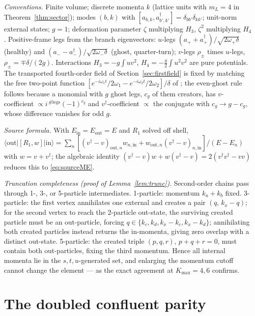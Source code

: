 \documentclass[11pt]{article}
\theoremstyle{definition}
\theoremstyle{remark}
\newcommand{\w}{\omega}
\newcommand{\dg}{\dagger}
\begin{document}
\emph{Conventions.}  Finite volume; discrete momenta $k$ (lattice units
with $m_L=4$ in Theorem~\ref{thm:sector}); modes $(b,k)$ with
$[a_{b,k},a^{\dg}_{b',k'}]=\delta_{bb'}\delta_{kk'}$; unit-norm
external states; $g=1$; deformation parameter $\zeta$ multiplying
$H_3$, $\zeta^2$ multiplying $H_4$.  Positive-frame legs from the
branch eigenvectors:
$u$-legs $(a_++a_+^{\dg})/\sqrt{2\w_+\delta}$ (healthy) and
$(a_--a_-^{\dg})/\sqrt{2\w_-\delta}$ (ghost, quarter-turn);
$v$-legs $\rho_\pm$ times $u$-legs, $\rho_\pm=\mp\delta/(2g)$.
Interactions $H_3=-g\!\int\!uv^2$, $H_4=-\tfrac g2\!\int\!u^2v^2$ are
pure potentials.  The transported fourth-order field of
Section~\ref{sec:firstfield} is fixed by matching the free two-point
function $[e^{-i\w_1t}/2\w_1-e^{-i\w_2t}/2\w_2]/\delta$ of
\cite{paperIII}; the even-ghost rule follows because a monomial with
$g$ ghost legs, $c_g$ of them creators, has $v$-coefficient
$\propto i^{\,\#\mathrm{legs}}(-1)^{c_g}$ and
$v^{\dg}$-coefficient $\propto$ the conjugate with
$c_g\to g-c_g$, whose difference vanishes for odd $g$.

\emph{Source formula.}  With $E_{\mathrm{in}}=E_{\mathrm{out}}=E$ and
$R_1$ solved off shell,
$\langle\mathrm{out}|[R_1,w]|\mathrm{in}\rangle
=\sum_n[(v^{\dg}-v)_{\mathrm{out},n}w_{n,\mathrm{in}}
+w_{\mathrm{out},n}(v^{\dg}-v)_{n,\mathrm{in}}]/(E-E_n)$ with
$w=v+v^{\dg}$; the algebraic identity
$(v^{\dg}-v)w+w(v^{\dg}-v)=2(v^{\dg}v^{\dg}-vv)$ reduces this to
\eqref{eq:sourceME}.

\emph{Truncation completeness (proof of Lemma~\ref{lem:trunc}).}
Second-order chains pass through 1-, 3-, or 5-particle intermediates.
1-particle: momentum $k_a+k_b$ fixed.  3-particle: the first vertex
annihilates one external and creates a pair $(q,\,k_x-q)$; for the
second vertex to reach the 2-particle out-state, the surviving created
particle must be an out-particle, forcing
$q\in\{k_c,k_d,k_x-k_c,k_x-k_d\}$; annihilating both created particles
instead returns the in-momenta, giving zero overlap with a distinct
out-state.  5-particle: the created triple $(p,q,r)$, $p+q+r=0$, must
contain both out-particles, fixing the third momentum.  Hence all
internal momenta lie in the $s,t,u$-generated set, and enlarging the
momentum cutoff cannot change the element --- as the exact agreement at
$K_{\max}=4,6$ confirms.

\section{The doubled confluent parity}\label{app:parity}
\end{document}
